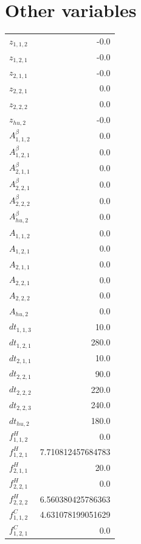 \documentclass{article}%
\makeatletter
\let\mcnewpage=\newpage%
\newcommand{\TrickSupertabularIntoMulticols}{%
\renewcommand\newpage{%
\if@firstcolumn%
\hrule width\linewidth height0pt%
\columnbreak%
\else%
\mcnewpage%
\fi%
}%
}%
\makeatother
\begin{document}
\section{Other variables}%
\thispagestyle{plain}%
\begin{multicols*}{3}%
\TrickSupertabularIntoMulticols%
%
\begin{supertabular}{lr}%
	$z_{1,1,2}$ & -0.0 \\%
	$z_{1,2,1}$ & -0.0 \\%
	$z_{2,1,1}$ & -0.0 \\%
	$z_{2,2,1}$ & 0.0 \\%
	$z_{2,2,2}$ & 0.0 \\%
	$z_{hu,2}$ & -0.0 \\%
	$A_{1,1,2}^{\beta}$ & 0.0 \\%
	$A_{1,2,1}^{\beta}$ & 0.0 \\%
	$A_{2,1,1}^{\beta}$ & 0.0 \\%
	$A_{2,2,1}^{\beta}$ & 0.0 \\%
	$A_{2,2,2}^{\beta}$ & 0.0 \\%
	$A_{hu,2}^{\beta}$ & 0.0 \\%
	$A_{1,1,2}$ & 0.0 \\%
	$A_{1,2,1}$ & 0.0 \\%
	$A_{2,1,1}$ & 0.0 \\%
	$A_{2,2,1}$ & 0.0 \\%
	$A_{2,2,2}$ & 0.0 \\%
	$A_{hu,2}$ & 0.0 \\%
	$dt_{1,1,3}$ & 10.0 \\%
	$dt_{1,2,1}$ & 280.0 \\%
	$dt_{2,1,1}$ & 10.0 \\%
	$dt_{2,2,1}$ & 90.0 \\%
	$dt_{2,2,2}$ & 220.0 \\%
	$dt_{2,2,3}$ & 240.0 \\%
	$dt_{hu,2}$ & 180.0 \\%
	$f_{1,1,2}^{H}$ & 0.0 \\%
	$f_{1,2,1}^{H}$ & 7.710812457684783 \\%
	$f_{2,1,1}^{H}$ & 20.0 \\%
	$f_{2,2,1}^{H}$ & 0.0 \\%
	$f_{2,2,2}^{H}$ & 6.560380425786363 \\%
	$f_{1,1,2}^{C}$ & 4.631078199051629 \\%
	$f_{1,2,1}^{C}$ & 0.0 \\%

\end{supertabular}
\end{multicols*}
\end{document}

